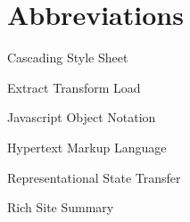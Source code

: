 \chapter*{Abbreviations}

\begin{description}
\setlength{\itemsep}{-11pt}
\setlength{\leftmargin}{900pt}


\item[CSS] Cascading Style Sheet

\item[ETL] Extract Transform Load

\item[JSON] Javascript Object Notation

\item[HTML] Hypertext Markup Language

\item[REST] Representational State Transfer
\item[RSS] Rich Site Summary

\end{description}
